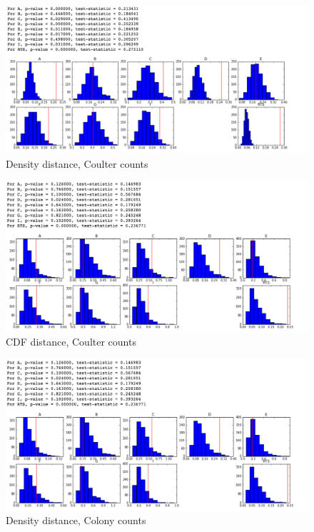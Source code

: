 \documentclass{article}
\begin{document}
\begin{figure}[htbp]
\centering
\includegraphics{images/perm_dens_coulter.png}
\caption{Density distance, Coulter counts}
\end{figure}

\begin{figure}[htbp]
\centering
\includegraphics{images/perm_cdf_coulter.png}
\caption{CDF distance, Coulter counts}
\end{figure}

\begin{figure}[htbp]
\centering
\includegraphics{images/perm_dens_colony.png}
\caption{Density distance, Colony counts}
\end{figure}
\end{document}
